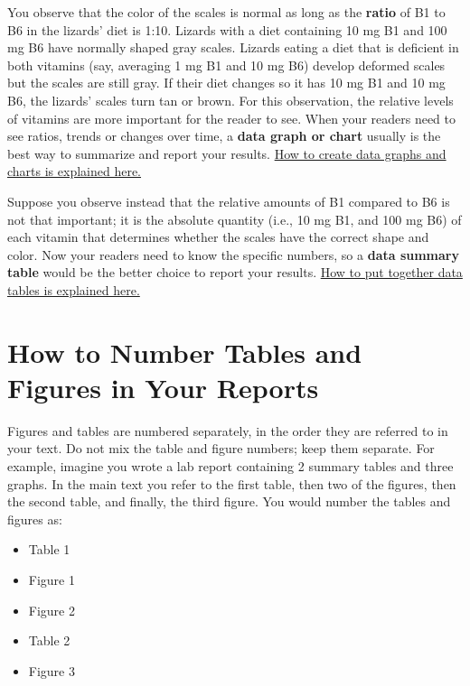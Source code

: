 \documentclass[
]{book}
\providecommand{\tightlist}{%
  \setlength{\itemsep}{0pt}\setlength{\parskip}{0pt}}
\begin{document}
You observe that the color of the scales is normal as long as the \textbf{ratio} of B1 to B6 in the lizards' diet is 1:10. Lizards with a diet containing 10 mg B1 and 100 mg B6 have normally shaped gray scales. Lizards eating a diet that is deficient in both vitamins (say, averaging 1 mg B1 and 10 mg B6) develop deformed scales but the scales are still gray. If their diet changes so it has 10 mg B1 and 10 mg B6, the lizards' scales turn tan or brown. For this observation, the relative levels of vitamins are more important for the reader to see. When your readers need to see ratios, trends or changes over time, a \textbf{data graph or chart} usually is the best way to summarize and report your results. \protect\hyperlink{chartsone425}{How to create data graphs and charts is explained here.}

Suppose you observe instead that the relative amounts of B1 compared to B6 is not that important; it is the absolute quantity (i.e., 10 mg B1, and 100 mg B6) of each vitamin that determines whether the scales have the correct shape and color. Now your readers need to know the specific numbers, so a \textbf{data summary table} would be the better choice to report your results. \protect\hyperlink{tables435}{How to put together data tables is explained here.}

\hypertarget{how-to-number-tables-and-figures-in-your-reports}{%
\section{How to Number Tables and Figures in Your Reports}\label{how-to-number-tables-and-figures-in-your-reports}}

Figures and tables are numbered separately, in the order they are referred to in your text. Do not mix the table and figure numbers; keep them separate. For example, imagine you wrote a lab report containing 2 summary tables and three graphs. In the main text you refer to the first table, then two of the figures, then the second table, and finally, the third figure. You would number the tables and figures as:

\begin{itemize}
\tightlist
\item
  Table 1
\item
  Figure 1
\item
  Figure 2
\item
  Table 2
\item
  Figure 3
\end{itemize}
\end{document}
